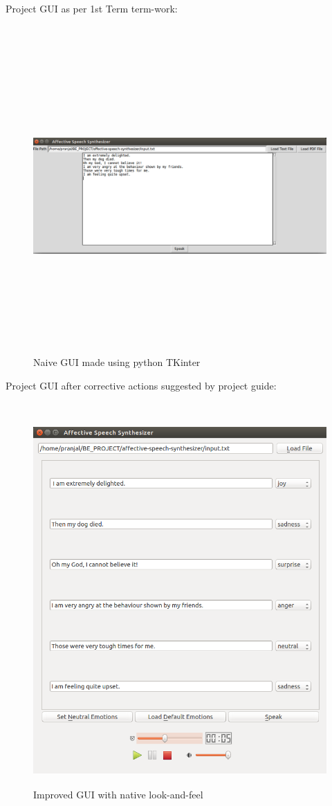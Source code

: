\documentclass[oneside,a4paper,12pt]{book}
\begin{document}
\begin{appendices}
\hspace*{0mm}Project GUI as per 1st Term term-work:\\ \\
\begin{figure}[ht]
	\centering
	\includegraphics[width=400pt, height=340pt]{earlier_gui.png}
	\caption{Naive GUI made using python TKinter}
	\label{fig:Naive GUI made using python TKinter}
\end{figure}

\newpage
Project GUI after corrective actions suggested by project guide:\\\\
\begin{figure}[ht]
	\centering
	\includegraphics[width=400pt, height=400pt]{later_gui.png}
	\caption{Improved GUI with native look-and-feel}
	\label{Improved GUI with native look-and-feel}
\end{figure}


\end{appendices}
\end{document}
